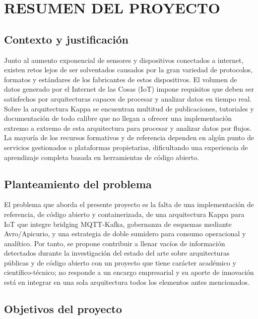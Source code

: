 \chapter{RESUMEN DEL PROYECTO}

\section{Contexto y justificación}

Junto al aumento exponencial de sensores y dispositivos conectados a internet, existen retos lejos de ser solventados causados por la gran variedad de protocolos, formatos y estándares de los fabricantes de estos dispositivos. El volumen de datos generado por el Internet de las Cosas (IoT) impone requisitos que deben ser satisfechos por arquitecturas capaces de procesar y analizar datos en tiempo real. Sobre la arquitectura Kappa se encuentran multitud de publicaciones, tutoriales y documentación de todo calibre que no llegan a ofrecer una implementación extremo a extremo de esta arquitectura para procesar y analizar datos por flujos. La mayoría de los recursos formativos y de referencia dependen en algún punto de servicios gestionados o plataformas propietarias, dificultando una experiencia de aprendizaje completa basada en herramientas de código abierto.

\section{Planteamiento del problema}

El problema que aborda el presente proyecto es la falta de una implementación de referencia, de código abierto y containerizada, de una arquitectura Kappa para IoT que integre bridging MQTT-Kafka, gobernanza de esquemas mediante Avro/Apicurio, y una estrategia de doble sumidero para consumo operacional y analítico. Por tanto, se propone contribuir a llenar vacíos de información detectados durante la investigación del estado del arte sobre arquitecturas públicas y de código abierto con un proyecto que tiene carácter académico y científico-técnico; no responde a un encargo empresarial y su aporte de innovación está en integrar en una sola arquitectura todos los elementos antes mencionados.

\section{Objetivos del proyecto}

